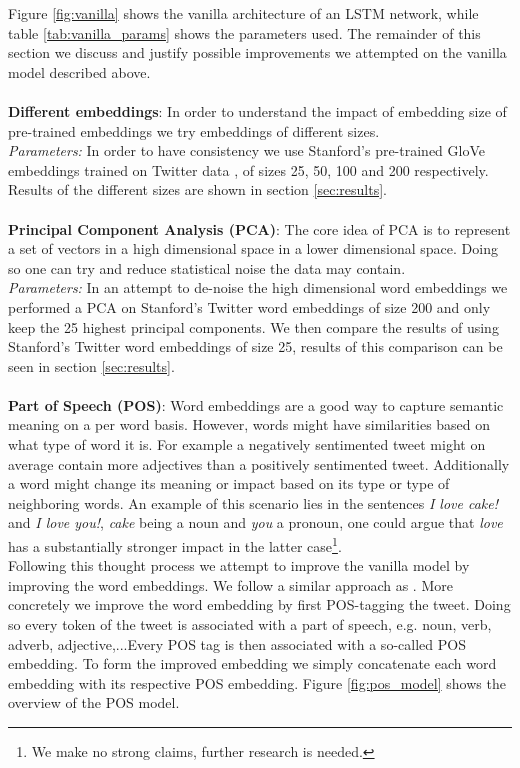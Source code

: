 \documentclass[conference]{IEEEtran}
\newcommand{\Glove}{GloVe }
\begin{document}
    Figure \ref{fig:vanilla} shows the vanilla architecture of an LSTM network, while table \ref{tab:vanilla_params} shows the parameters used.
	The remainder of this section we discuss and justify possible improvements we attempted on the vanilla model described above.\\\\
	\textbf{Different embeddings}: In order to understand the impact of embedding size of pre-trained embeddings we try embeddings of different sizes. \\
\indent \textit{Parameters:} In order to have consistency we use Stanford's pre-trained \Glove embeddings trained on Twitter data \cite{GLOVE}, of sizes 25, 50, 100 and 200 respectively. Results of the different sizes are shown in section \ref{sec:results}.\\\\
\textbf{Principal Component Analysis (PCA)}: The core idea of PCA is to represent a set of vectors in a high dimensional space in a lower dimensional space. Doing so one can try and reduce statistical noise the data may contain. \\
\indent \textit{Parameters:} In an attempt to de-noise the high dimensional word embeddings we performed a PCA on Stanford's Twitter word embeddings of size 200 and only keep the 25 highest principal components. We then compare the results of using Stanford's Twitter word embeddings of size 25, results of this comparison can be seen in section \ref{sec:results}.\\\\
\textbf{Part of Speech (POS)}:
Word embeddings are a good way to capture semantic meaning on a per word basis. However, words might have similarities based on what type of word it is. For example a negatively sentimented tweet might on average contain more adjectives than a positively sentimented tweet. Additionally a word might change its meaning or impact based on its type or type of neighboring words. An example of this scenario lies in the sentences \textit{I love cake!} and \textit{I love you!}, \textit{cake} being a noun and \textit{you} a pronoun, one could argue that \textit{love} has a substantially stronger impact in the latter case\footnote{We make no strong claims, further research is needed.}.\\
\indent Following this thought process we attempt to improve the vanilla model by improving the word embeddings. We follow	a similar approach as \cite{POS_EMB}. More concretely we improve the word embedding by first POS-tagging the tweet. Doing so every token of the tweet is associated with a part of speech, e.g. noun, verb, adverb, adjective,...Every POS tag is then associated with a so-called POS embedding. To form the improved embedding we simply concatenate each word embedding with its respective POS embedding. Figure \ref{fig:pos_model} shows the overview of the POS model.
\end{document}
